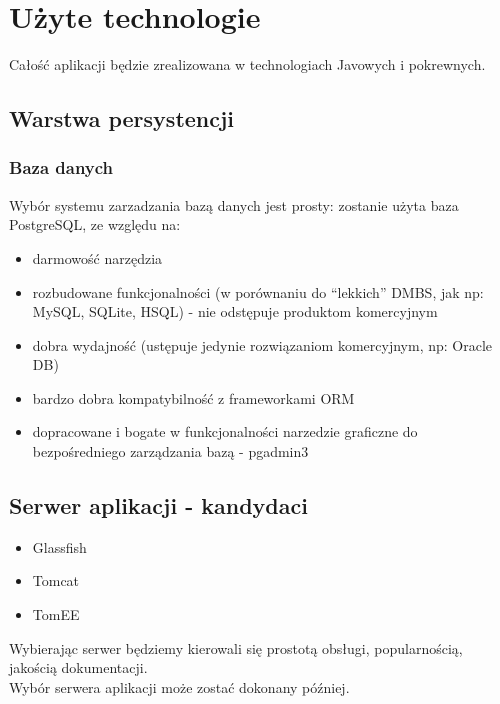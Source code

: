 \documentclass[a4paper,12pt,notitlepage]{mwrep}
\begin{document}
\section{Użyte technologie}
Całość aplikacji będzie zrealizowana w technologiach Javowych i pokrewnych.

\subsection{Warstwa persystencji}
\subsubsection{Baza danych}
Wybór systemu zarzadzania bazą danych jest prosty: zostanie użyta baza PostgreSQL,
ze względu na:
\begin{itemize}
	\item	darmowość narzędzia
	\item	rozbudowane funkcjonalności (w porównaniu do “lekkich” DMBS, jak np: MySQL, SQLite, HSQL) - nie odstępuje produktom komercyjnym
	\item	dobra wydajność (ustępuje jedynie rozwiązaniom komercyjnym, np: Oracle DB)
	\item	bardzo dobra kompatybilność z frameworkami ORM
	\item	dopracowane i bogate w funkcjonalności narzedzie graficzne do bezpośredniego zarządzania bazą - pgadmin3
\end{itemize}

\subsection{Serwer aplikacji - kandydaci}
\begin{itemize}
	\item	Glassfish
	\item	Tomcat
	\item	TomEE
\end{itemize}
Wybierając serwer będziemy kierowali się prostotą obsługi, popularnością, jakością dokumentacji.\\
Wybór serwera aplikacji może zostać dokonany później.
\end{document}
